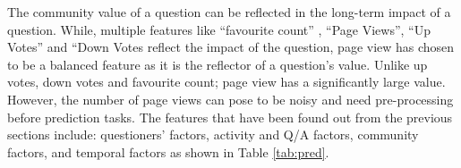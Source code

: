 \begin{table}[]
	\centering
	\small
	\caption{Feature coefficients for prediction task 1}
	\label{tab:8features}
\end{table}


The community value of a question can be reflected in the long-term impact of a question. While, multiple features like “favourite count” , “Page Views”, “Up Votes” and “Down Votes reflect the impact of the question, page view has chosen to be a balanced feature as it is the reflector of a question’s value. Unlike up votes, down votes and favourite count; page view has a significantly large value. However, the number of page views can pose to be noisy and need pre-processing before prediction tasks. 
The features that have been found out from the previous sections include: questioners’ factors, activity and Q/A factors, community factors, and temporal factors as shown in Table \ref{tab:pred}.


